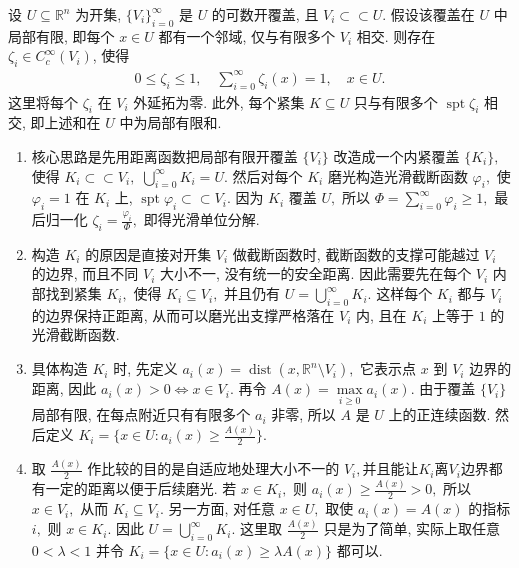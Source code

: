 \documentclass[../../main.tex]{subfiles}
\begin{document}
\begin{lemma}[开集上的光滑单位分解]\label{lemma:ch05-光滑单位分解-p7R3}
设 $U\subseteq\mathbb{R}^{n}$ 为开集, $\{V_i\}_{i=0}^{\infty}$ 是 $U$ 的可数开覆盖, 且 $V_i\subset\subset U$. 假设该覆盖在 $U$ 中局部有限, 即每个 $x\in U$ 都有一个邻域, 仅与有限多个 $V_i$ 相交. 则存在 $\zeta_i\in C_c^\infty(V_i)$, 使得
\begin{align*}
0\leqslant\zeta_i\leqslant1,\quad
\sum\limits_{i=0}^{\infty}\zeta_i(x)=1,\quad x\in U.
\end{align*}
这里将每个 $\zeta_i$ 在 $V_i$ 外延拓为零. 此外, 每个紧集 $K\subseteq U$ 只与有限多个 $\operatorname{spt}\zeta_i$ 相交, 即上述和在 $U$ 中为局部有限和.
\end{lemma}
\begin{note}
\begin{enumerate}[(1)]
\item 核心思路是先用距离函数把局部有限开覆盖 $\{V_i\}$ 改造成一个内紧覆盖 $\{K_i\},$ 使得
$K_i\subset\subset V_i,$
$\bigcup\limits_{i=0}^{\infty}K_i=U.$
然后对每个 $K_i$ 磨光构造光滑截断函数 $\varphi_i,$ 使
$\varphi_i=1$ 在 $K_i$ 上,
$\operatorname{spt}\varphi_i\subset\subset V_i.$
因为 $K_i$ 覆盖 $U,$ 所以 $\Phi=\sum\limits_{i=0}^{\infty}\varphi_i\geqslant1,$ 最后归一化
$\zeta_i=\frac{\varphi_i}{\Phi},$
即得光滑单位分解.
\item 构造 $K_i$ 的原因是直接对开集 $V_i$ 做截断函数时, 截断函数的支撑可能越过 $V_i$ 的边界, 而且不同 $V_i$ 大小不一, 没有统一的安全距离. 因此需要先在每个 $V_i$ 内部找到紧集 $K_i,$ 使得
$K_i\subseteq V_i,$
并且仍有
$U=\bigcup\limits_{i=0}^{\infty}K_i.$
这样每个 $K_i$ 都与 $V_i$ 的边界保持正距离, 从而可以磨光出支撑严格落在 $V_i$ 内, 且在 $K_i$ 上等于 $1$ 的光滑截断函数.
\item 具体构造 $K_i$ 时, 先定义
$a_i(x)=\operatorname{dist}(x,\mathbb{R}^{n}\setminus V_i),$
它表示点 $x$ 到 $V_i$ 边界的距离, 因此
$a_i(x)>0\iff x\in V_i.$
再令
$A(x)=\max\limits_{i\geqslant0}a_i(x).$
由于覆盖 $\{V_i\}$ 局部有限, 在每点附近只有有限多个 $a_i$ 非零, 所以 $A$ 是 $U$ 上的正连续函数. 然后定义
$K_i=\{x\in U:a_i(x)\geqslant\frac{A(x)}{2}\}.$

\item 取 $\frac{A(x)}{2}$ 作比较的目的是自适应地处理大小不一的 $V_i,$并且能让$K_i$离$V_i$边界都有一定的距离以便于后续磨光. 若 $x\in K_i,$ 则
$a_i(x)\geqslant\frac{A(x)}{2}>0,$
所以 $x\in V_i,$ 从而 $K_i\subseteq V_i.$ 另一方面, 对任意 $x\in U,$ 取使
$a_i(x)=A(x)$
的指标 $i,$ 则
$x\in K_i.$
因此
$U=\bigcup\limits_{i=0}^{\infty}K_i.$
这里取 $\frac{A(x)}{2}$ 只是为了简单, 实际上取任意 $0<\lambda<1$ 并令
$K_i=\{x\in U:a_i(x)\geqslant\lambda A(x)\}$
都可以.


\end{enumerate}
\end{note}
\end{document}
